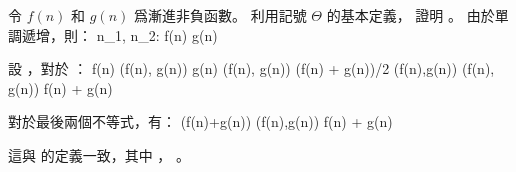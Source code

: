 \startEXERCISE
令 $f(n)$ 和 $g(n)$ 爲漸進非負函數。
利用記號 $\Theta$ 的基本定義，
證明 。
\stopEXERCISE
\startANSWER
由於單調遞增，則：
\startsplitformula\startalign[n=3]
\NC \exists n_1, n_2: \NC f(n)  \NC \quad{} \NR
\NC                   \NC g(n)  \NC \quad{} \NR
\stopalign\stopsplitformula

設 ，對於 ：
\startsplitformula\startalign
\NC f(n) \NC \leq \max(f(n), g(n)) \NR
\NC g(n) \NC \leq \max(f(n), g(n)) \NR
\NC (f(n) + g(n))/2 \NC \leq \max(f(n),g(n)) \NR
\NC \max(f(n), g(n)) \NC \leq f(n) + g(n) \NR
\stopalign\stopsplitformula

對於最後兩個不等式，有：
 \leq {}(f(n)+g(n)) \leq \max(f(n),g(n)) \leq f(n) + g(n)
\stopformula

這與  的定義一致，其中 ， 。
\stopANSWER
